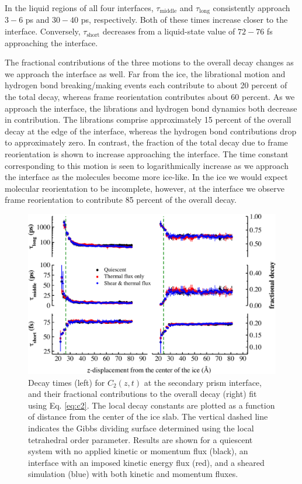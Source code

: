 \documentclass[journal = jpccck, manuscript = article]{achemso}
\begin{document}
In the liquid regions of all four interfaces, $\tau_\mathrm{middle}$
and $\tau_\mathrm{long}$ consistently approach $3-6$ ps and $30-40$
ps, respectively.  Both of these times increase closer to the
interface.  Conversely, $\tau_\mathrm{short}$ decreases from a
liquid-state value of $72-76$ fs approaching the interface.

The fractional contributions of the three motions to the overall decay
changes as we approach the interface as well. Far from the ice, the
librational motion and hydrogen bond breaking/making events each
contribute to about 20 percent of the total decay, whereas frame
reorientation contributes about 60 percent. As we approach the
interface, the librations and hydrogen bond dynamics both decrease in
contribution. The librations comprise approximately 15 percent of the
overall decay at the edge of the interface, whereas the hydrogen bond
contributions drop to approximately zero. In contrast, the fraction of
the total decay due to frame reorientation is shown to increase
approaching the interface.  The time constant corresponding to this
motion is seen to logarithmically increase as we approach the interface
as the molecules become more ice-like. In the ice we would expect
molecular reorientation to be incomplete, however, at the interface we
observe frame reorientation to contribute 85 percent of the overall
decay.

\newpage
\begin{figure}
\includegraphics[width=\linewidth]{Sec_lcorrz}
\caption{\label{fig:SPorient} Decay times (left) for $C_2(z,t)$ at the
  secondary prism interface, and their fractional contributions to the
  overall decay (right) fit using Eq. \eqref{eq:c2}. The local decay
  constants are plotted as a function of distance from the center of
  the ice slab. The vertical dashed line indicates the Gibbs dividing
  surface determined using the local tetrahedral order parameter.
  Results are shown for a quiescent system with no applied kinetic or
  momentum flux (black), an interface with an imposed
  kinetic energy flux (red), and a sheared simulation (blue) with both
  kinetic and momentum fluxes.}
\end{figure}
\end{document}
